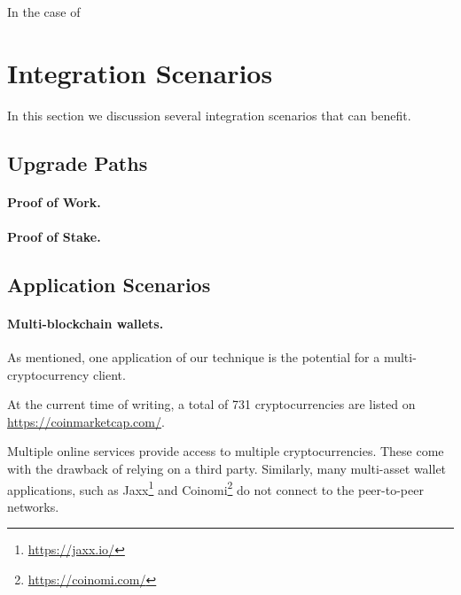 In the case of 


\section{Integration Scenarios}

In this section we discussion several integration scenarios that can benefit.

\subsection{Upgrade Paths}

\paragraph{Proof of Work.}

\paragraph{Proof of Stake.}

\subsection{Application Scenarios}

\paragraph{Multi-blockchain wallets.}
As mentioned, one application of our technique is the potential for a multi-cryptocurrency client.

At the current time of writing, a total of 731 cryptocurrencies are listed on 
\url{https://coinmarketcap.com/}.


Multiple online services provide access to multiple cryptocurrencies. These come with the drawback of relying on a third party.
Similarly, many multi-asset wallet applications, such as Jaxx\footnote{\url{https://jaxx.io/}} and Coinomi\footnote{\url{https://coinomi.com/}} do not connect to the peer-to-peer networks.

